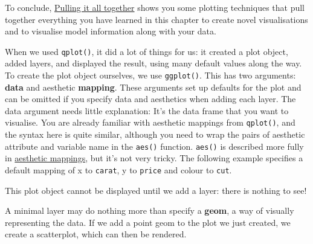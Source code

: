 To conclude, \hyperref[sec:pull-together]{Pulling it all together} shows
you some plotting techniques that pull together everything you have
learned in this chapter to create novel visualisations and to visualise
model information along with your data.


When we used \texttt{qplot()}, it did a lot of things for us: it created
a plot object, added layers, and displayed the result, using many
default values along the way. To create the plot object ourselves, we
use \texttt{ggplot()}. This has two arguments: \textbf{data} and
aesthetic \textbf{mapping}. These arguments set up defaults for the plot
and can be omitted if you specify data and aesthetics when adding each
layer. The data argument needs little explanation: It's the data frame
that you want to visualise. You are already familiar with aesthetic
mappings from \texttt{qplot()}, and the syntax here is quite similar,
although you need to wrap the pairs of aesthetic attribute and variable
name in the \texttt{aes()} function. \texttt{aes()} is described more
fully in \hyperref[sec:aes]{aesthetic mappings}, but it's not very
tricky. The following example specifies a default mapping of x to
\texttt{carat}, y to \texttt{price} and colour to \texttt{cut}.

\begin{Shaded}
\begin{Highlighting}[]
\StringTok{ } 
\end{Highlighting}
\end{Shaded}

This plot object cannot be displayed until we add a layer: there is
nothing to see!


A minimal layer may do nothing more than specify a \textbf{geom}, a way
of visually representing the data. If we add a point geom to the plot we
just created, we create a scatterplot, which can then be rendered.

